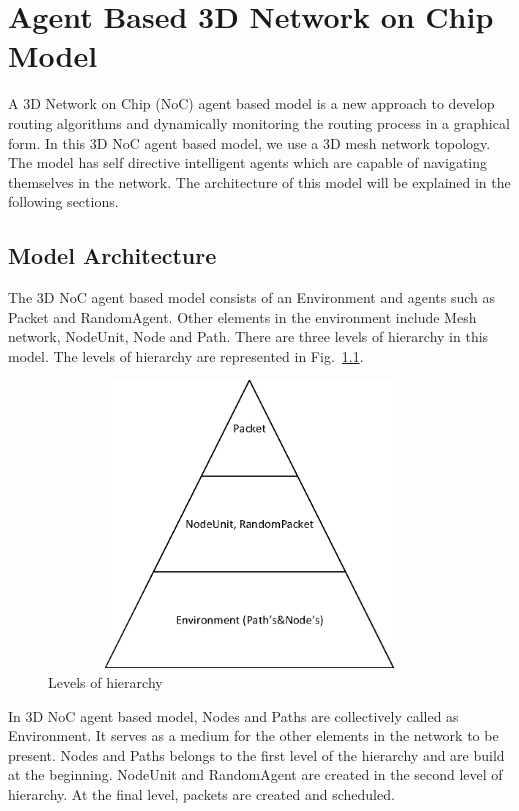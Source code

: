 \chapter{Agent Based 3D Network on Chip Model}
\label{Chapter.six}

A 3D Network on Chip (NoC) agent based model is a new approach to develop routing algorithms and dynamically monitoring the routing process in a graphical form. In this 3D NoC agent based model, we use a 3D mesh network topology. The model has self directive intelligent agents which are capable of navigating themselves in the network. The architecture of this model will be explained in the following sections. 

\section{Model Architecture}
\vspace{5mm}

The 3D NoC agent based model consists of an Environment and agents such as Packet and RandomAgent. Other elements in the environment include Mesh network, NodeUnit, Node and Path. There are three levels of hierarchy in this model. The levels of hierarchy are represented in Fig.~\ref{fig:6.1}.

\begin{figure}[H]
\vspace{10mm}
\centering
\includegraphics[height=3.0in, width=4.2in]{Level's_of_Heirarchy.eps}
\caption{Levels of hierarchy}
\label{fig:6.1}
\vspace{10mm}
\end{figure} 

In 3D NoC agent based model, Nodes and Paths are collectively called as Environment. It serves as a medium for the other elements in the network to be present. Nodes and Paths belongs to the first level of the hierarchy and are build at the beginning. NodeUnit and RandomAgent are created in the second level of hierarchy. At the final level, packets are created and scheduled. 

